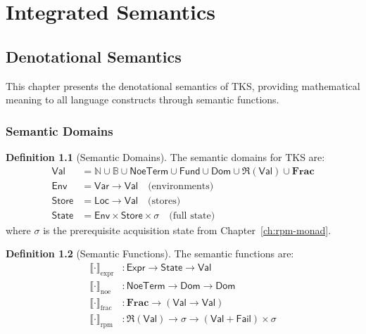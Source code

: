 \documentclass[11pt,twoside,openright]{book}
\theoremstyle{definition}
\newtheorem{definition}{Definition}[chapter]
\theoremstyle{plain}
\theoremstyle{remark}
\newcommand{\N}{\mathbb{N}}
\newcommand{\Bool}{\mathbb{B}}
\newcommand{\RPM}{\mathfrak{R}}
\newcommand{\FracSet}{\mathbf{Frac}}
\newcommand{\Val}{\mathsf{Val}}
\newcommand{\Env}{\mathsf{Env}}
\newcommand{\Store}{\mathsf{Store}}
\newcommand{\State}{\mathsf{State}}
\newcommand{\Var}{\mathsf{Var}}
\newcommand{\Loc}{\mathsf{Loc}}
\newcommand{\Expr}{\mathsf{Expr}}
\newcommand{\Dom}{\mathsf{Dom}}
\newcommand{\Fund}{\mathsf{Fund}}
\newcommand{\NoeTerm}{\mathsf{NoeTerm}}
\newcommand{\AcqState}{\sigma}
\newcommand{\Failed}{\mathsf{Fail}}
\begin{document}

\part{Integrated Semantics}

\chapter{Denotational Semantics}
\label{ch:denotational}

This chapter presents the denotational semantics of TKS, providing mathematical meaning to all language constructs through semantic functions.

\section{Semantic Domains}

\begin{definition}[Semantic Domains]
\label{def:semantic-domains}
The semantic domains for TKS are:
\begin{align}
\Val &= \N \cup \Bool \cup \NoeTerm \cup \Fund \cup \Dom \cup \RPM(\Val) \cup \FracSet \\
\Env &= \Var \to \Val \quad \text{(environments)} \\
\Store &= \Loc \to \Val \quad \text{(stores)} \\
\State &= \Env \times \Store \times \AcqState \quad \text{(full state)}
\end{align}
where $\AcqState$ is the prerequisite acquisition state from Chapter~\ref{ch:rpm-monad}.
\end{definition}

\begin{definition}[Semantic Functions]
\label{def:semantic-functions}
The semantic functions are:
\begin{align}
\llbracket \cdot \rrbracket_{\text{expr}} &: \Expr \to \State \to \Val \\
\llbracket \cdot \rrbracket_{\text{noe}} &: \NoeTerm \to \Dom \to \Dom \\
\llbracket \cdot \rrbracket_{\text{frac}} &: \FracSet \to (\Val \to \Val) \\
\llbracket \cdot \rrbracket_{\text{rpm}} &: \RPM(\Val) \to \AcqState \to (\Val + \Failed) \times \AcqState
\end{align}
\end{definition}
\end{document}
